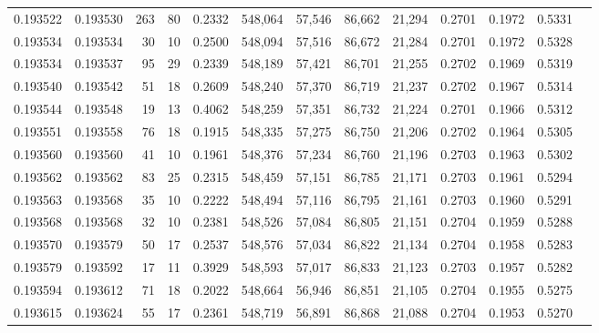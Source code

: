 \begin{tabular}{rrrrrrrrrrrrr}
0.193522 & 0.193530 &   263 &  80 &                                     0.2332 & 548,064 &  57,546 &  86,662 &  21,294 & 0.2701 & 0.1972 & 0.5331 \\
0.193534 & 0.193534 &    30 &  10 &                                     0.2500 & 548,094 &  57,516 &  86,672 &  21,284 & 0.2701 & 0.1972 & 0.5328 \\
0.193534 & 0.193537 &    95 &  29 &                                     0.2339 & 548,189 &  57,421 &  86,701 &  21,255 & 0.2702 & 0.1969 & 0.5319 \\
0.193540 & 0.193542 &    51 &  18 &                                     0.2609 & 548,240 &  57,370 &  86,719 &  21,237 & 0.2702 & 0.1967 & 0.5314 \\
0.193544 & 0.193548 &    19 &  13 &                                     0.4062 & 548,259 &  57,351 &  86,732 &  21,224 & 0.2701 & 0.1966 & 0.5312 \\
0.193551 & 0.193558 &    76 &  18 &                                     0.1915 & 548,335 &  57,275 &  86,750 &  21,206 & 0.2702 & 0.1964 & 0.5305 \\
0.193560 & 0.193560 &    41 &  10 &                                     0.1961 & 548,376 &  57,234 &  86,760 &  21,196 & 0.2703 & 0.1963 & 0.5302 \\
0.193562 & 0.193562 &    83 &  25 &                                     0.2315 & 548,459 &  57,151 &  86,785 &  21,171 & 0.2703 & 0.1961 & 0.5294 \\
0.193563 & 0.193568 &    35 &  10 &                                     0.2222 & 548,494 &  57,116 &  86,795 &  21,161 & 0.2703 & 0.1960 & 0.5291 \\
0.193568 & 0.193568 &    32 &  10 &                                     0.2381 & 548,526 &  57,084 &  86,805 &  21,151 & 0.2704 & 0.1959 & 0.5288 \\
0.193570 & 0.193579 &    50 &  17 &                                     0.2537 & 548,576 &  57,034 &  86,822 &  21,134 & 0.2704 & 0.1958 & 0.5283 \\
0.193579 & 0.193592 &    17 &  11 &                                     0.3929 & 548,593 &  57,017 &  86,833 &  21,123 & 0.2703 & 0.1957 & 0.5282 \\
0.193594 & 0.193612 &    71 &  18 &                                     0.2022 & 548,664 &  56,946 &  86,851 &  21,105 & 0.2704 & 0.1955 & 0.5275 \\
0.193615 & 0.193624 &    55 &  17 &                                     0.2361 & 548,719 &  56,891 &  86,868 &  21,088 & 0.2704 & 0.1953 & 0.5270 \\

\end{tabular}
